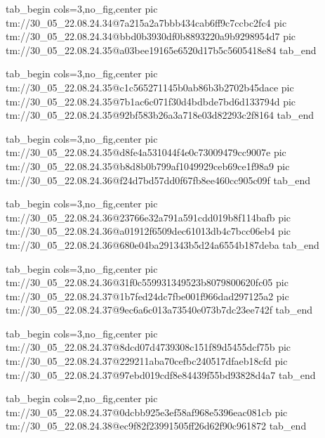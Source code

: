 \ifcmt
  tab_begin cols=3,no_fig,center
    pic tm://30_05_22.08.24.34@7a215a2a7bbb434cab6ff9c7ccbc2fc4
    pic tm://30_05_22.08.24.34@bbd0b3930df0b8893220a9b9298954d7
    pic tm://30_05_22.08.24.35@a03bee19165e6520d17b5c5605418e84
  tab_end
\fi


\ifcmt
  tab_begin cols=3,no_fig,center
    pic tm://30_05_22.08.24.35@c1c565271145b0ab86b3b2702b45dace
    pic tm://30_05_22.08.24.35@7b1ac6c071f30d4bdbde7bd6d133794d
    pic tm://30_05_22.08.24.35@92bf583b26a3a718e03d82293c2f8164
  tab_end
\fi


\ifcmt
  tab_begin cols=3,no_fig,center
    pic tm://30_05_22.08.24.35@d8fe4a531044f4e0c73009479cc9007e
    pic tm://30_05_22.08.24.35@b8d8b0b799af1049929ceb69ce1f98a9
    pic tm://30_05_22.08.24.36@f24d7bd57dd0f67fb8ee460cc905c09f
  tab_end
\fi


\ifcmt
  tab_begin cols=3,no_fig,center
    pic tm://30_05_22.08.24.36@23766e32a791a591cdd019b8f114bafb
    pic tm://30_05_22.08.24.36@a01912f6509dec61013db4c7bcc06eb4
    pic tm://30_05_22.08.24.36@680e04ba291343b5d24a6554b187deba
  tab_end
\fi


\ifcmt
  tab_begin cols=3,no_fig,center
    pic tm://30_05_22.08.24.36@31f0c559931349523b8079800620fc05
    pic tm://30_05_22.08.24.37@1b7fed24dc7fbe001f966dad297125a2
    pic tm://30_05_22.08.24.37@9ec6a6c013a73540e073b7dc23ee742f
  tab_end
\fi


\ifcmt
  tab_begin cols=3,no_fig,center
    pic tm://30_05_22.08.24.37@8dcd07d4739308c151f89d5455dcf75b
    pic tm://30_05_22.08.24.37@229211aba70cefbc240517dfaeb18cfd
    pic tm://30_05_22.08.24.37@97ebd019cdf8e84439f55bd93828d4a7
  tab_end
\fi


\ifcmt
  tab_begin cols=2,no_fig,center
    pic tm://30_05_22.08.24.37@0dcbb925e3ef58af968e5396eac081cb
    pic tm://30_05_22.08.24.38@ec9f82f23991505ff26d62f90c961872
  tab_end
\fi


